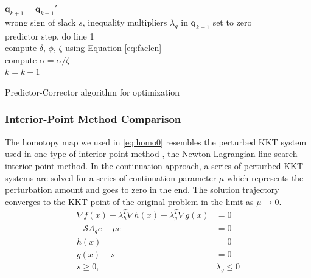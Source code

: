 \documentclass{article}
\theoremstyle{definition}
\begin{document}
\begin{algorithm}
{{    }
    $\boldsymbol{q}_{k+1}  = \boldsymbol{q}_{k+1}' $  \\
    wrong sign of slack $s$, inequality multipliers $\lambda_g$ in $\boldsymbol{q}_{k+1}$ set to zero \\
    predictor step, do line 1 \\
    compute $\delta$, $\phi$, $\zeta$ using Equation \eqref{eq:faclen}  \\
    compute $\alpha = \alpha / \zeta $\\  %
    $k = k + 1$ \\
}
\caption{Predictor-Corrector algorithm for optimization}
\end{algorithm}



\subsubsection{Interior-Point Method Comparison}
The homotopy map we used in \eqref{eq:homo0} resembles the perturbed KKT system used in one type of interior-point method \cite{Nocedal2006NO}, the Newton-Lagrangian line-search interior-point method. In the continuation approach, a series of perturbed KKT systems are solved for a series of continuation parameter $\mu$ which represents the perturbation amount and goes to zero in the end. The solution trajectory converges to the KKT point of the original problem in the limit as $\mu \rightarrow 0$.   
\begin{equation}\label{eq:kkt1}
\begin{aligned}
\nabla f(x) + \lambda_h^T \nabla h(x) + \lambda_g^T \nabla g(x) &= 0 \\
-\mathcal{S} \Lambda_g e - \mu e &= 0\\
h(x) &= 0 \\
g(x) - s &= 0 \\
s \geq 0, \quad &\lambda_g \leq 0 \\
\end{aligned}
\end{equation}
\end{document}
